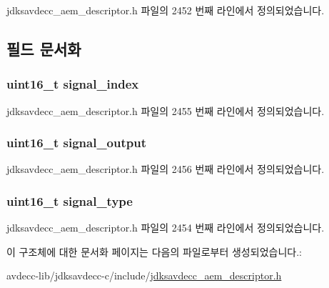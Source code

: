 jdksavdecc\+\_\+aem\+\_\+descriptor.\+h 파일의 2452 번째 라인에서 정의되었습니다.



\subsection{필드 문서화}
\subsubsection[{\texorpdfstring{signal\+\_\+index}{signal_index}}]{\setlength{\rightskip}{0pt plus 5cm}uint16\+\_\+t signal\+\_\+index}\hypertarget{structjdksavdecc__signal__selector__source_ae2e81a95ee9ad83f1fe22b6a1ee29075}{}\label{structjdksavdecc__signal__selector__source_ae2e81a95ee9ad83f1fe22b6a1ee29075}


jdksavdecc\+\_\+aem\+\_\+descriptor.\+h 파일의 2455 번째 라인에서 정의되었습니다.

\subsubsection[{\texorpdfstring{signal\+\_\+output}{signal_output}}]{\setlength{\rightskip}{0pt plus 5cm}uint16\+\_\+t signal\+\_\+output}\hypertarget{structjdksavdecc__signal__selector__source_ab4b91864e6fc335d7e86536d9f4461e4}{}\label{structjdksavdecc__signal__selector__source_ab4b91864e6fc335d7e86536d9f4461e4}


jdksavdecc\+\_\+aem\+\_\+descriptor.\+h 파일의 2456 번째 라인에서 정의되었습니다.

\subsubsection[{\texorpdfstring{signal\+\_\+type}{signal_type}}]{\setlength{\rightskip}{0pt plus 5cm}uint16\+\_\+t signal\+\_\+type}\hypertarget{structjdksavdecc__signal__selector__source_a248e60ef99d5ed1779989d1dd6b6dc5a}{}\label{structjdksavdecc__signal__selector__source_a248e60ef99d5ed1779989d1dd6b6dc5a}


jdksavdecc\+\_\+aem\+\_\+descriptor.\+h 파일의 2454 번째 라인에서 정의되었습니다.



이 구조체에 대한 문서화 페이지는 다음의 파일로부터 생성되었습니다.\+:\begin{DoxyCompactItemize}
\item 
avdecc-\/lib/jdksavdecc-\/c/include/\hyperlink{jdksavdecc__aem__descriptor_8h}{jdksavdecc\+\_\+aem\+\_\+descriptor.\+h}\end{DoxyCompactItemize}
